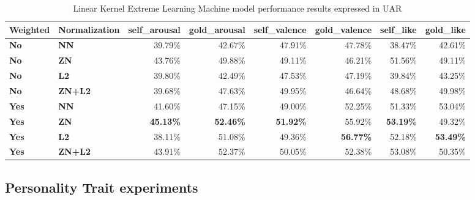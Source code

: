 \begin{table*}[h]
\begin{tabular}{|l|l|r|r|r|r|r|r|}
\hline
\rowcolor[HTML]{C0C0C0} 
\textbf{Weighted} & \textbf{Normalization} & \multicolumn{1}{l|}{\cellcolor[HTML]{C0C0C0}\textbf{self\_arousal}} & \multicolumn{1}{l|}{\cellcolor[HTML]{C0C0C0}\textbf{gold\_arousal}} & \multicolumn{1}{l|}{\cellcolor[HTML]{C0C0C0}\textbf{self\_valence}} & \multicolumn{1}{l|}{\cellcolor[HTML]{C0C0C0}\textbf{gold\_valence}} & \multicolumn{1}{l|}{\cellcolor[HTML]{C0C0C0}\textbf{self\_like}} & \multicolumn{1}{l|}{\cellcolor[HTML]{C0C0C0}\textbf{gold\_like}} \\ \hline
\textbf{No} & \textbf{NN} & \cellcolor[HTML]{FFE2E2}39.79\% & \cellcolor[HTML]{FFAEAE}42.67\% & \cellcolor[HTML]{FFF9E7}47.91\% & \cellcolor[HTML]{FFF9E9}47.78\% & \cellcolor[HTML]{FFFFFF}38.47\% & \cellcolor[HTML]{D1EDDF}42.61\% \\ \hline
\textbf{No} & \textbf{ZN} & \cellcolor[HTML]{FF9B9B}43.76\% & \cellcolor[HTML]{FF2E2E}49.88\% & \cellcolor[HTML]{FFF4D5}49.11\% & \cellcolor[HTML]{FFFFFF}46.21\% & \cellcolor[HTML]{6DC499}51.56\% & \cellcolor[HTML]{88CFAD}49.11\% \\ \hline
\textbf{No} & \textbf{L2} & \cellcolor[HTML]{FFE1E1}39.80\% & \cellcolor[HTML]{FFB2B2}42.49\% & \cellcolor[HTML]{FFFAEC}47.53\% & \cellcolor[HTML]{FFFCF1}47.19\% & \cellcolor[HTML]{F0F9F5}39.84\% & \cellcolor[HTML]{CAEADA}43.25\% \\ \hline
\textbf{No} & \textbf{ZN+L2} & \cellcolor[HTML]{FFE4E4}39.68\% & \cellcolor[HTML]{FF5656}47.63\% & \cellcolor[HTML]{FFF1C9}49.95\% & \cellcolor[HTML]{FFFEF9}46.64\% & \cellcolor[HTML]{8DD1B0}48.68\% & \cellcolor[HTML]{7FCBA6}49.98\% \\ \hline
\textbf{Yes} & \textbf{NN} & \cellcolor[HTML]{FFC1C1}41.60\% & \cellcolor[HTML]{FF5F5F}47.15\% & \cellcolor[HTML]{FFF5D7}49.00\% & \cellcolor[HTML]{FFE8A8}52.25\% & \cellcolor[HTML]{70C59B}51.33\% & \cellcolor[HTML]{5CBE8E}53.04\% \\ \hline
\textbf{Yes} & \textbf{ZN} & \cellcolor[HTML]{FF8383}\textbf{45.13\%} & \cellcolor[HTML]{FF0000}\textbf{52.46\%} & \cellcolor[HTML]{FFE9AD}\textbf{51.92\%} & \cellcolor[HTML]{FFDA73}55.92\% & \cellcolor[HTML]{5BBD8D}\textbf{53.19\%} & \cellcolor[HTML]{86CEAB}49.32\% \\ \hline
\textbf{Yes} & \textbf{L2} & \cellcolor[HTML]{FFFFFF}38.11\% & \cellcolor[HTML]{FF1919}51.08\% & \cellcolor[HTML]{FFF3D2}49.36\% & \cellcolor[HTML]{FFD666}\textbf{56.77\%} & \cellcolor[HTML]{66C195}52.18\% & \cellcolor[HTML]{57BB8A}\textbf{53.49\%} \\ \hline
\textbf{Yes} & \textbf{ZN+L2} & \cellcolor[HTML]{FF9898}43.91\% & \cellcolor[HTML]{FF0202}52.37\% & \cellcolor[HTML]{FFF1C8}50.05\% & \cellcolor[HTML]{FFE8A6}52.38\% & \cellcolor[HTML]{5CBD8E}53.08\% & \cellcolor[HTML]{7BCAA3}50.35\% \\ \hline
\end{tabular}
\caption{Linear Kernel Extreme Learning Machine model performance results expressed in UAR}
\label{tab:lkelm}
\end{table*}

\subsection{Personality Trait experiments}